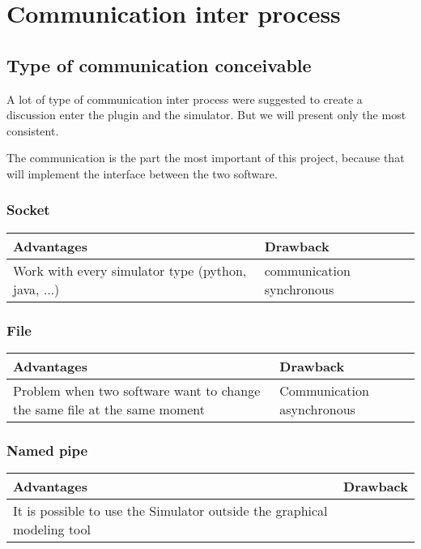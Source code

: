 
\chapter{Communication inter process}

\section{Type of communication conceivable}

A lot of type of communication inter process were suggested to create a discussion enter the plugin and the simulator. But we will present only the most consistent.

The communication is the part the most important of this project, because that will implement the interface between the two software.

\subsection{Socket}

\begin{tabular}{|p{}||p{}|}
\hline
  \textbf{Advantages}&\textbf{Drawback}\\
\hline
Work with every simulator type (python, java, ...) & communication synchronous\\
\hline
\end{tabular}

\subsection{File}

\begin{tabular}{|p{}||p{}|}
\hline
  \textbf{Advantages}&\textbf{Drawback}\\
\hline
Problem when two software want to change the same file at the same moment& Communication asynchronous\\
\hline
\end{tabular}

\subsection{Named pipe}

\begin{tabular}{|p{}||p{}|}
\hline
  \textbf{Advantages}&\textbf{Drawback}\\
\hline
It is possible to use the Simulator outside the graphical modeling tool & \\
\hline
\end{tabular}


